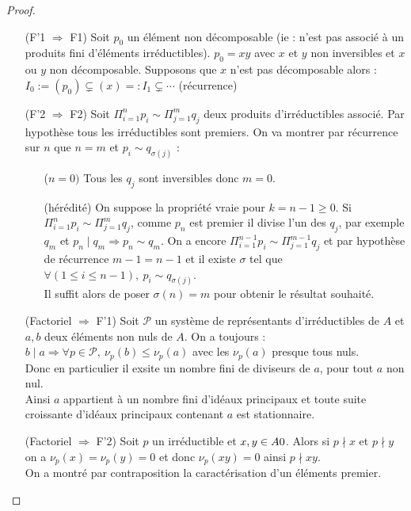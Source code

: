 \begin{proof}\
 \begin{itemize}
  \item [(F'1 $\Rightarrow$ F1)] Soit $p_0$ un élément non décomposable (ie :
n'est pas associé à un produits fini d'éléments irréductibles). $p_0 = xy$ avec
$x$ et $y$ non inversibles et $x$ ou $y$ non décomposable. Supposons que $x$
n'est pas décomposable alors :    
$I_0 := (p_0) \subsetneq (x) =: I_1 \subsetneq \cdots$ (récurrence)

  \item [(F'2 $\Rightarrow$ F2)] Soit $\Pi_{i=1}^n p_i \sim \Pi_{j=1}^m q_j$
deux produits d'irréductibles associé. Par hypothèse tous les irréductibles
sont premiers. On va montrer par récurrence sur $n$ que $n=m$ et $p_i \sim
q_{\sigma(j)}$ :
\begin{itemize}
 \item [($n=0)$] Tous les $q_j$ sont inversibles donc $m = 0$.
 \item [(hérédité)] On suppose la propriété vraie pour $k = n-1 \geq 0$. Si 
 $\Pi_{i=1}^n p_i \sim \Pi_{j=1}^m q_j$, comme $p_n$ est premier il divise
l'un des $q_j$, par exemple $q_m$ et $p_n\mid q_m \Rightarrow p_n\sim q_m$.
On a encore $\Pi_{i=1}^{n-1} p_i \sim \Pi_{j=1}^{m-1} q_j$ et par hypothèse
de récurrence $m-1 = n-1$ et il existe $\sigma$ tel que $\forall (1\leq i\leq
n-1),\ p_i \sim q_{\sigma (j)}$. \\ Il suffit alors de poser $\sigma(n) = m$
pour obtenir le résultat souhaité.
\end{itemize}
\item[(Factoriel $\Rightarrow$ F'1)] Soit $\mathcal{P}$ un système de
représentants d'irréductibles de $A$ et $a, b$ deux éléments non nuls de $A$.
On a toujours : $b\mid a \Rightarrow \forall p \in \mathcal{P},\ \nu_p(b)
\leq \nu_p(a)$ avec les $\nu_p(a)$ presque tous nuls.\\ Donc en particulier il
exsite un nombre fini de diviseurs de $a$, pour tout $a$ non nul.\\ Ainsi $a$
appartient à un nombre fini d'idéaux principaux et toute suite croissante
d'idéaux principaux contenant $a$ est stationnaire.
\item[(Factoriel $\Rightarrow$ F'2)] Soit $p$ un irréductible et $x,y \in
A\-{0}$. Alors si $p\nmid x$ et $p\nmid y$ on a $\nu_p(x) = \nu_p(y) = 0$ et
donc $\nu_p(xy) = 0$ ainsi $p\nmid xy$.\\
On a montré par contraposition la caractérisation d'un éléments premier.
\end{itemize}
\end{proof}

